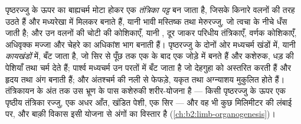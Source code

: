 \begin{proposition}[तंत्रिकायन और शरीर-योजना]\label{prop:b2:vertebrate-development:neurulation}
पृष्ठरज्जु के ऊपर का बाह्यचर्म मोटा होकर एक \emph{तंत्रिका
पट्ट} बन जाता है, जिसके किनारे वलनों की तरह उठते हैं और मध्यरेखा में
मिलकर \emph{} बनाते हैं, यानी भावी मस्तिष्क तथा मेरुरज्जु,
जो त्वचा के नीचे धँस जाती है; और उन वलनों की चोटी की कोशिकाएँ, यानी
\emph{}, दूर जाकर परिधीय तंत्रिकाएँ,
वर्णक कोशिकाएँ, अधिवृक्क मज्जा और चेहरे का अधिकांश भाग बनाती हैं।
पृष्ठरज्जु के दोनों ओर मध्यचर्म खंडों में, यानी
\emph{कायखंडों} में, बँट जाता है, जो सिर से पूँछ तक एक के बाद एक जोड़े
में बनते हैं और कशेरुक, धड़ की पेशियाँ तथा चर्म देते हैं; पार्श्व
मध्यचर्म उन परतों में बँट जाता है जो देहगुहा को अस्तरित करती हैं और
हृदय तथा अंग बनाती हैं; और अंतश्चर्म की नली से फेफड़े, यकृत तथा
अग्न्याशय मुकुलित होते हैं। तंत्रिकायन के अंत तक उस भ्रूण के पास
कशेरुकी शरीर-योजना है --- किसी पृष्ठरज्जु के ऊपर एक पृष्ठीय तंत्रिका
रज्जु, एक अधर आँत, खंडित पेशी, एक सिर --- और वह भी कुछ मिलिमीटर की
लंबाई पर, और बाक़ी विकास इसी योजना से अंगों का विस्तार है
(\cref{ch:b2:limb-organogenesis})।
\end{proposition}

